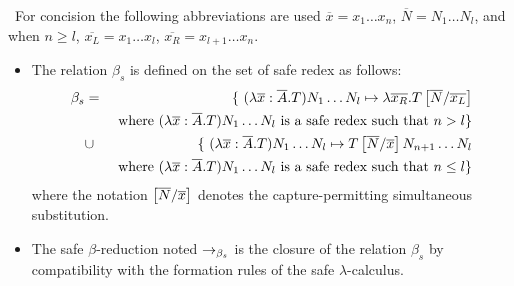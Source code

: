 \begin{dfn} \
For concision the following abbreviations are used $\overline{x} = x_1 \ldots
x_n$, $\overline{N} = N_1 \ldots N_l$, and when $n\geq l$, $\overline{x_L} = x_1 \ldots
x_l$, $\overline{x_R} = x_{l+1} \ldots x_n$.
\begin{itemize}
\item The relation $\beta_s$ is defined on the set of safe redex as follows:
\begin{eqnarray*}
\beta_s &=&
\{  \ (\lambda \overline{x} : \overline{A} . T) N_1 \ldots N_l \mapsto \lambda \overline{x_R}. T\left[ \overline{N}/\overline{x_L} \right]  \\
&& \mbox{ where $(\lambda \overline{x} : \overline{A} . T) N_1 \ldots N_l$ is a safe redex such that $n> l$}
\} \\
&\cup&
\{ \ (\lambda \overline{x} : \overline{A} . T) N_1 \ldots N_l \mapsto T\left[ \overline{N}/\overline{x} \right] N_{n+1} \ldots N_l  \\
&& \mbox{ where $(\lambda \overline{x} : \overline{A} . T) N_1 \ldots N_l$ is a safe redex such that $n\leq l$}
\}
\end{eqnarray*}
where the notation $\left[ \overline{N}/\overline{x} \right]$ denotes the capture-permitting simultaneous substitution.

\item
The safe $\beta$-reduction noted $\rightarrow_{\beta_s}$ is the closure
of the relation $\beta_s$ by compatibility with the formation rules
of the safe $\lambda$-calculus.
\end{itemize}
\end{dfn}



